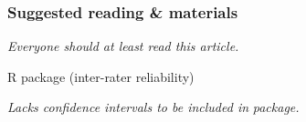 \documentclass[t]{beamer} %
\begin{document}
\begin{frame}[c]
  \frametitle{Suggested reading \& materials}

  \begin{center}
    
    \gap[1]
    \emph{Everyone should at least read this article.}

    \gap[3]
    R package  (inter-rater reliability)

    \gap[1]
    \emph{Lacks confidence intervals \so to be included in}  \emph{package.}
    
  \end{center}
\end{frame}



\end{document}
